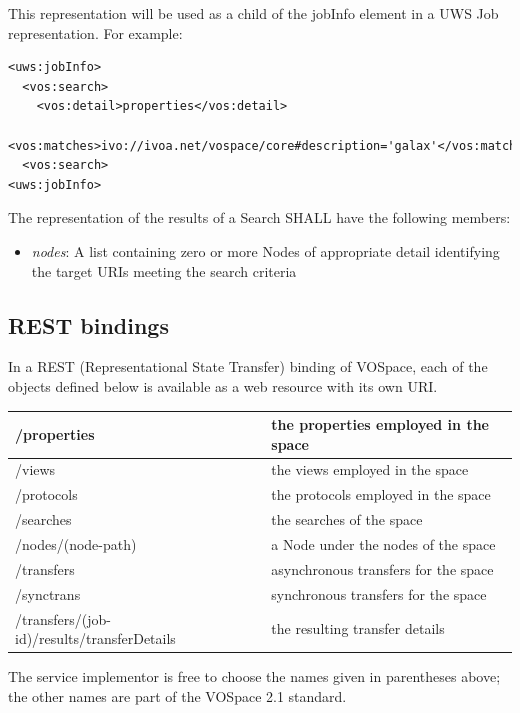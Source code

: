 \documentclass[11pt,a4paper]{ivoa}
\begin{document}
This representation will be used as a child of the jobInfo element in a UWS Job representation. For example:

\begin{lstlisting}
<uws:jobInfo>
  <vos:search>
    <vos:detail>properties</vos:detail>
    <vos:matches>ivo://ivoa.net/vospace/core#description='galax'</vos:matches>
  <vos:search>
<uws:jobInfo>
\end{lstlisting}

The representation of the results of a Search SHALL have the following members:

\begin{itemize}
    \item \emph{nodes}: A list containing zero or more Nodes of appropriate detail identifying the target URIs meeting the search criteria
\end{itemize}

\subsection{REST bindings}
\label{subsec:rest bindings}
In a REST (Representational State Transfer) binding of VOSpace, each of the objects defined below is available as a web resource with its own URI.

\vspace{3mm}
\begin{tabular}{ l p{4cm} }
    \hline
    /properties & the properties employed in the space \\
    \hline
    /views & the views employed in the space \\
    \hline
    /protocols & the protocols employed in the space \\
    \hline
    /searches & the searches of the space \\
    \hline
    /nodes/(node-path) & a Node under the nodes of the space \\
    \hline
    /transfers & asynchronous transfers for the space \\
    \hline
    /synctrans & synchronous transfers for the space \\
    \hline
    /transfers/(job-id)/results/transferDetails & the resulting transfer details \\
    \hline
\end{tabular}
\vspace{3mm}

The service implementor is free to choose the names given in parentheses above; the other names are part of the VOSpace 2.1 standard.
\end{document}
